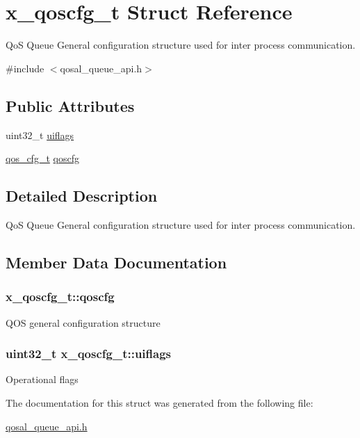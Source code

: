 \hypertarget{structx__qoscfg__t}{\section{x\-\_\-qoscfg\-\_\-t Struct Reference}
\label{structx__qoscfg__t}
}


Qo\-S Queue General configuration structure used for inter process communication.  




{\ttfamily \#include $<$qosal\-\_\-queue\-\_\-api.\-h$>$}

\subsection*{Public Attributes}
\begin{DoxyCompactItemize}
\item 
uint32\-\_\-t \hyperlink{structx__qoscfg__t_ac098e70da1453dadcbfd90d71821dd58}{uiflags}
\item 
\hyperlink{group__FAPI__QOS__GENERAL_gabfc98fb0c7c5226badf1eb79b4ab6e2b}{qos\-\_\-cfg\-\_\-t} \hyperlink{structx__qoscfg__t_a3171bbbcee1d1bc312a211c41073f183}{qoscfg}
\end{DoxyCompactItemize}


\subsection{Detailed Description}
Qo\-S Queue General configuration structure used for inter process communication. 

\subsection{Member Data Documentation}
\hypertarget{structx__qoscfg__t_a3171bbbcee1d1bc312a211c41073f183}{
\subsubsection[{qoscfg}]{ x\-\_\-qoscfg\-\_\-t\-::qoscfg}}\label{structx__qoscfg__t_a3171bbbcee1d1bc312a211c41073f183}
Q\-O\-S general configuration structure \hypertarget{structx__qoscfg__t_ac098e70da1453dadcbfd90d71821dd58}{
\subsubsection[{uiflags}]{\setlength{\rightskip}{0pt plus 5cm}uint32\-\_\-t x\-\_\-qoscfg\-\_\-t\-::uiflags}}\label{structx__qoscfg__t_ac098e70da1453dadcbfd90d71821dd58}
Operational flags 

The documentation for this struct was generated from the following file\-:\begin{DoxyCompactItemize}
\item 
\hyperlink{qosal__queue__api_8h}{qosal\-\_\-queue\-\_\-api.\-h}\end{DoxyCompactItemize}
